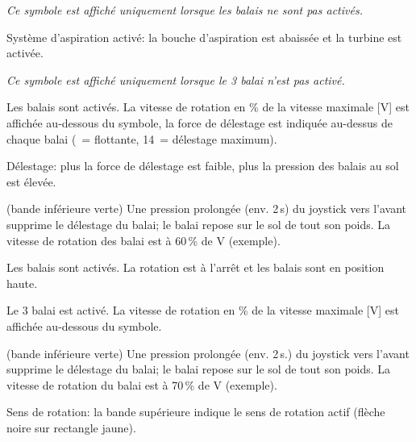 {\em Ce symbole est affiché uniquement lorsque les balais ne sont pas activés.}

\startSymVpad
{}
\SymVpad
{} Système d'aspiration activé:
la bouche d'aspiration est abaissée et la turbine est activée.
\stopSymVpad



{\em Ce symbole est affiché uniquement lorsque le 3 balai n'est pas activé.}

\startSymVpad
{}
\SymVpad
{} Les balais sont activés. La vitesse de rotation en \% de la vitesse
maximale [V] est affichée au-dessous du symbole, la force de délestage
est indiquée au-dessus de chaque balai (\type{~}~= flottante, 14~= délestage maximum).

{\md Délestage:} {\lt plus la force de délestage est faible, plus la pression des balais au sol est élevée.}
\stopSymVpad


\startSymVpad
{}
\SymVpad
{} (bande inférieure verte)
Une pression prolongée (env. 2\,s) du joystick vers l'avant supprime le délestage
du balai; le balai repose sur le sol de tout son poids. La vitesse de rotation des balai est à 60\,\% de V
(exemple).
\stopSymVpad

\startSymVpad
{}
\SymVpad
{} Les balais sont activés. La rotation est à l'arrêt et les balais sont en position haute.
\stopSymVpad



\startSymVpad
{}
\SymVpad
{} Le 3 balai est activé. La vitesse de rotation en \% de la vitesse
maximale [V] est affichée au-dessous du symbole.
\stopSymVpad


\startSymVpad
{}
\SymVpad
{} (bande inférieure verte)
Une pression prolongée (env. 2\,s.) du joystick vers l'avant supprime le délestage
du balai; le balai repose sur le sol de tout son poids. La vitesse de rotation du balai est à 70\,\% de V
(exemple).

{\md Sens de rotation:} {\lt la bande supérieure indique le sens de rotation actif
(flèche noire sur rectangle jaune).}
\stopSymVpad

